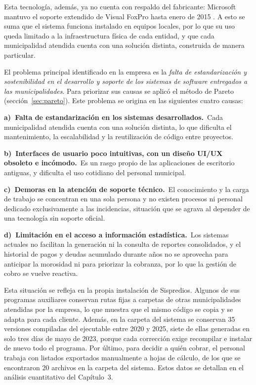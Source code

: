 \documentclass[12pt,a4paper]{report}
\newcommand{\causa}[2]{\par\noindent\hangindent=1.25cm\hangafter=1 \textbf{#1)~#2.}\ }
\begin{document}
Esta tecnología, además, ya no cuenta con respaldo del fabricante: Microsoft mantuvo el soporte extendido de Visual FoxPro hasta enero de 2015 \parencite{taft2007}. A esto se suma que el sistema funciona instalado en equipos locales, por lo que su uso queda limitado a la infraestructura física de cada entidad, y que cada municipalidad atendida cuenta con una solución distinta, construida de manera particular.

El problema principal identificado en la empresa es la \textit{falta de estandarización y sostenibilidad en el desarrollo y soporte de los sistemas de software entregados a las municipalidades}. Para priorizar sus causas se aplicó el método de Pareto (sección~\ref{sec:pareto}). Este problema se origina en las siguientes cuatro causas:

\causa{a}{Falta de estandarización en los sistemas desarrollados}Cada municipalidad atendida cuenta con una solución distinta, lo que dificulta el mantenimiento, la escalabilidad y la reutilización de código entre proyectos.

\causa{b}{Interfaces de usuario poco intuitivas, con un diseño UI/UX obsoleto e incómodo}Es un rasgo propio de las aplicaciones de escritorio antiguas, y dificulta el uso cotidiano del personal municipal.

\causa{c}{Demoras en la atención de soporte técnico}El conocimiento y la carga de trabajo se concentran en una sola persona y no existen procesos ni personal dedicado exclusivamente a las incidencias, situación que se agrava al depender de una tecnología sin soporte oficial.

\causa{d}{Limitación en el acceso a información estadística}Los sistemas actuales no facilitan la generación ni la consulta de reportes consolidados, y el historial de pagos y deudas acumulado durante años no se aprovecha para anticipar la morosidad ni para priorizar la cobranza, por lo que la gestión de cobro se vuelve reactiva. %

Esta situación se refleja en la propia instalación de Sispredios. Algunos de sus programas auxiliares conservan rutas fijas a carpetas de otras municipalidades atendidas por la empresa, lo que muestra que el mismo código se copia y se adapta para cada cliente. Además, en la carpeta del sistema se conservan 35 versiones compiladas del ejecutable entre 2020 y 2025, siete de ellas generadas en solo tres días de mayo de 2023, porque cada corrección exige recompilar e instalar de nuevo todo el programa. Por último, para decidir a quién cobrar, el personal trabaja con listados exportados manualmente a hojas de cálculo, de los que se encontraron 20 archivos en la carpeta del sistema. Estos datos se detallan en el análisis cuantitativo del Capítulo~3.
\end{document}
